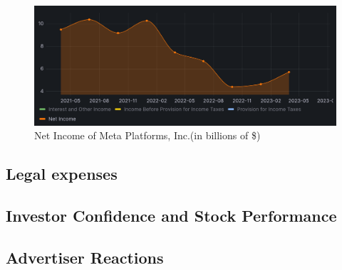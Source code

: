 \documentclass[12pt, a4paper]{article}
\begin{document}
\begin{figure}[h]
    \centering
    \includegraphics[width=1.00\textwidth]{net-income}
    \caption{Net Income of Meta Platforms, Inc.(in billions of \$)}
    \label{fig:net-income}
\end{figure}

\subsection*{Legal expenses}




\subsection*{Investor Confidence and Stock Performance}




\subsection*{Advertiser Reactions}
\end{document}
